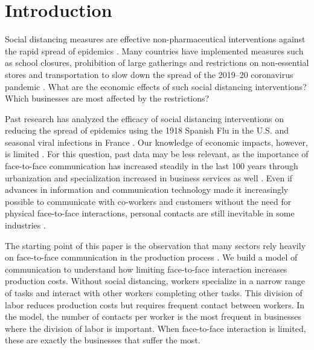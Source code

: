 \section*{Introduction}

Social distancing measures are effective non-pharmaceutical interventions against the rapid spread of epidemics \cite{Bootsma2007-ww,Markel2007-ad,Hatchett2007-gc,Wilder-Smith2020-jj}. Many countries have implemented measures such as school closures, prohibition of large gatherings and restrictions on non-essential stores and transportation to slow down the spread of the 2019--20 coronavirus pandemic \cite{Anderson2020-qk,Cohen2020-jw,Thompson2020-lc,noauthor_2020-xi}. What are the economic effects of such social distancing interventions? Which businesses are most affected by the restrictions?

Past research has analyzed the efficacy of social distancing interventions on reducing the spread of epidemics using the 1918 Spanish Flu in the U.S. \cite{Hatchett2007-gc,Markel2007-ad,Bootsma2007-ww} and seasonal viral infections in France \cite{Adda2016-mn}. Our knowledge of economic impacts, however, is limited \cite{Wren-Lewis2020-vc}. For this question, past data may be less relevant, as the importance of face-to-face communication has increased steadily in the last 100 years through urbanization \cite{Henderson2010-mv,Henderson2002-ji} and specialization increased in business services as well \cite{Herrendorf2014-jx,Duarte2019-kc}. 
Even if advances in information and communication technology made it increasingly possible to communicate with co-workers and customers without the need for physical face-to-face interactions, personal contacts are still inevitable in some industries \cite{Dingel2020-lh,von2020labour}.

The starting point of this paper is the observation that many sectors rely heavily on face-to-face communication in the production process \cite{Charlot2004-zr,Tian2019-wq}. We build a model of communication to understand how limiting face-to-face interaction increases production costs. Without social distancing, workers specialize in a narrow range of tasks and interact with other workers completing other tasks. This division of labor reduces production costs but requires frequent contact between workers. In the model, the number of contacts per worker is the most frequent in businesses where the division of labor is important. When face-to-face interaction is limited, these are exactly the businesses that suffer the most.


